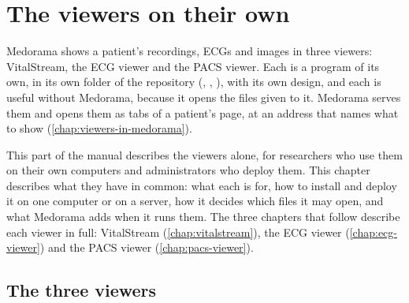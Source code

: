 \chapter{The viewers on their own}
\label{chap:viewers-alone}

Medorama shows a patient's recordings, ECGs and images in three viewers: VitalStream, the ECG
viewer and the PACS viewer. Each is a program of its own, in its own folder of the repository
(, , ), with its own design, and
each is useful without Medorama, because it opens the files given to it. Medorama serves them and
opens them as tabs of a patient's page, at an address that names what to show
(\cref{chap:viewers-in-medorama}).

This part of the manual describes the viewers alone, for researchers who use them on their own
computers and administrators who deploy them. This chapter describes what they have in common:
what each is for, how to install and deploy it on one computer or on a server, how it decides
which files it may open, and what Medorama adds when it runs them. The three chapters that follow
describe each viewer in full: VitalStream (\cref{chap:vitalstream}), the ECG viewer
(\cref{chap:ecg-viewer}) and the PACS viewer (\cref{chap:pacs-viewer}).

\section{The three viewers}
\label{sec:viewers-alone-three}

